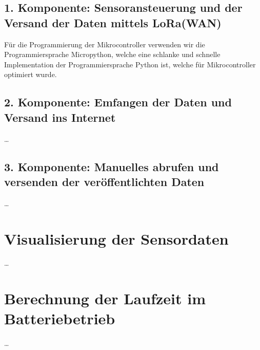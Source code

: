 \subsection{1. Komponente: Sensoransteuerung und der Versand der Daten mittels LoRa(WAN)} \label{Sender}

Für die Programmierung der Mikrocontroller verwenden wir die Programmiersprache Micropython, welche eine schlanke und schnelle Implementation der Programmiersprache Python ist, welche für Mikrocontroller optimiert wurde.

\subsection{2. Komponente: Emfangen der Daten und Versand ins Internet} \label{Empfänger}

\ldots

\subsection{3. Komponente: Manuelles abrufen und versenden der veröffentlichten Daten} \label{PubSub}

\ldots


\section{Visualisierung der Sensordaten} \label{Dashboard und Visualisierung}

\ldots


\section{Berechnung der Laufzeit im Batteriebetrieb} \label{Simulation}

\ldots
